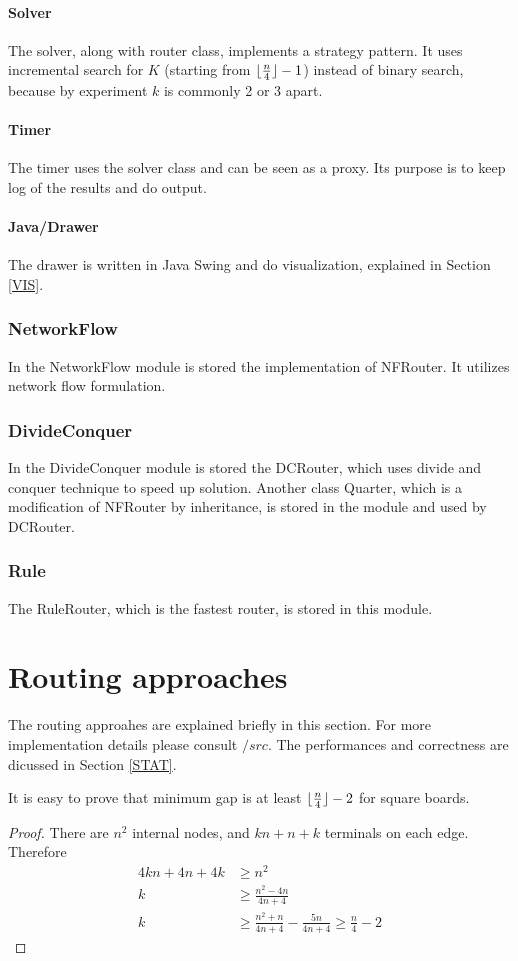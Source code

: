 \documentclass{article}
\DeclarePairedDelimiter\floor{\lfloor}{\rfloor}
\begin{document}
\begin{spacing}{1.1}
    \paragraph{Solver}
    The solver, along with router class, implements a strategy pattern. It uses incremental search for $K$ (starting from $\floor{\frac{n}{4}} - 1$) instead of binary search, because by experiment $k$ is commonly 2 or 3 apart.
    \paragraph{Timer}
    The timer uses the solver class and can be seen as a proxy. Its purpose is to keep log of the results and do output.
    \paragraph{Java/Drawer}
    The drawer is written in Java Swing and do visualization, explained in Section \ref{VIS}.
    \subsubsection{NetworkFlow}
    In the NetworkFlow module is stored the implementation of NFRouter. It utilizes network flow formulation.
    \subsubsection{DivideConquer}
    In the DivideConquer module is stored the DCRouter, which uses divide and conquer technique to speed up solution. Another class Quarter, which is a modification of NFRouter by inheritance, is stored in the module and used by DCRouter.
    \subsubsection{Rule}
    The RuleRouter, which is the fastest router, is stored in this module.
    \section{Routing approaches}
    The routing approahes are explained briefly in this section. For more implementation details please consult $/src$. The performances and correctness are dicussed in Section \ref{STAT}.

    It is easy to prove that minimum gap is at least $\floor{\frac{n}{4}} - 2$ for square boards.

    \begin{proof}
        There are $n^2$ internal nodes, and $kn + n + k$ terminals on each edge. Therefore
        \begin{align*}
            4kn + 4n + 4k &\ge n^2\\
            k &\ge \frac{n^2 - 4n}{4n + 4}\\
            k &\ge \frac{n^2 + n}{4n + 4} - \frac{5n}{4n + 4} \ge \frac{n}{4} - 2
        \end{align*}
    \end{proof}


\end{spacing}
\end{document}
